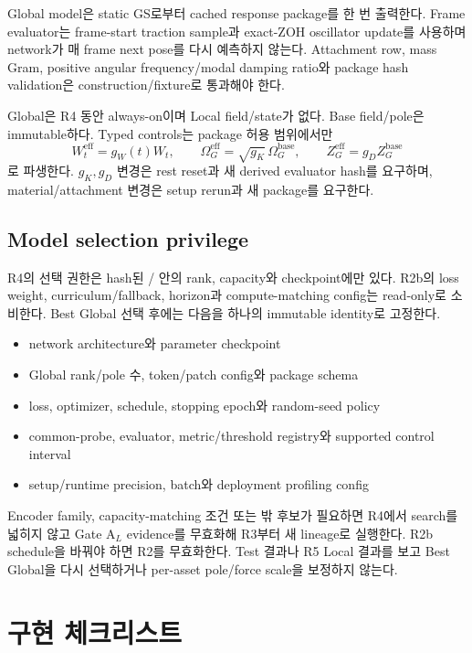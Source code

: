 \documentclass[10pt,a4paper]{article}
\begin{document}
Global model은 static GS로부터 cached response package를 한 번 출력한다. Frame evaluator는
frame-start traction sample과 exact-ZOH oscillator update를 사용하며 network가 매 frame next pose를
다시 예측하지 않는다. Attachment row, mass Gram, positive angular frequency/modal damping ratio와
package hash validation은 construction/fixture로 통과해야 한다.

Global은 R4 동안 always-on이며 Local field/state가 없다. Base field/pole은 immutable하다.
Typed controls는 package 허용 범위에서만
\[
  W_t^{\mathrm{eff}}=g_W(t)W_t,\qquad
  \Omega_G^{\mathrm{eff}}=\sqrt{g_K}\,\Omega_G^{\mathrm{base}},\qquad
  Z_G^{\mathrm{eff}}=g_D Z_G^{\mathrm{base}}
\]
로 파생한다. \(g_K,g_D\) 변경은 rest reset과 새 derived evaluator hash를 요구하며,
material/attachment 변경은 setup rerun과 새 package를 요구한다.

\subsection{Model selection privilege}

R4의 선택 권한은 hash된 / 안의 rank, capacity와 checkpoint에만 있다.
R2b의 loss weight, curriculum/fallback, horizon과 compute-matching config는 read-only로 소비한다.
Best Global 선택 후에는 다음을 하나의 immutable identity로 고정한다.

\begin{itemize}
  \item network architecture와 parameter checkpoint
  \item Global rank/pole 수, token/patch config와 package schema
  \item loss, optimizer, schedule, stopping epoch와 random-seed policy
  \item common-probe, evaluator, metric/threshold registry와 supported control interval
  \item setup/runtime precision, batch와 deployment profiling config
\end{itemize}

Encoder family, capacity-matching 조건 또는  밖 후보가 필요하면 R4에서 search를 넓히지 않고
Gate A\(_L\) evidence를 무효화해 R3부터 새 lineage로 실행한다. R2b schedule을 바꿔야 하면 R2를 무효화한다.
Test 결과나 R5 Local 결과를 보고 Best Global을 다시 선택하거나 per-asset pole/force scale을 보정하지 않는다.

\section{구현 체크리스트}
\label{sec:r4-chapter-4}
\end{document}
